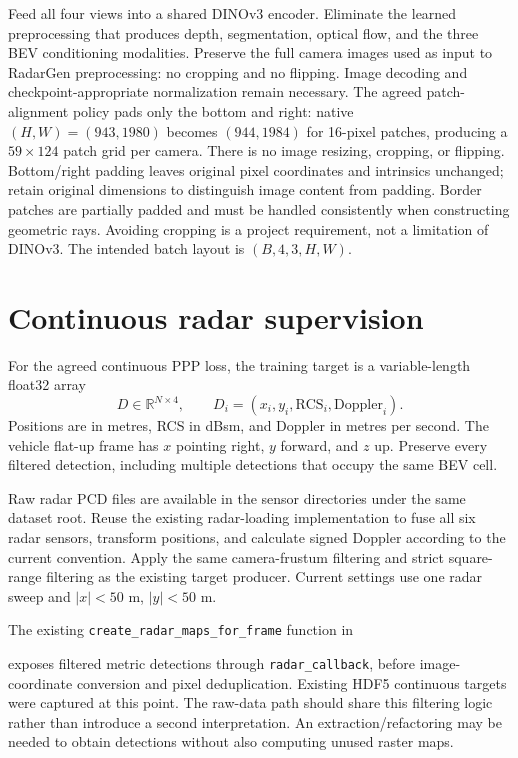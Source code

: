 \documentclass[11pt,a4paper]{article}
\begin{document}
Feed all four views into a shared DINOv3 encoder. Eliminate the learned preprocessing that produces depth, segmentation, optical flow, and the three BEV conditioning modalities. Preserve the full camera images used as input to RadarGen preprocessing: no cropping and no flipping. Image decoding and checkpoint-appropriate normalization remain necessary. The agreed patch-alignment policy pads only the bottom and right: native $(H,W)=(943,1980)$ becomes $(944,1984)$ for 16-pixel patches, producing a $59\times124$ patch grid per camera. There is no image resizing, cropping, or flipping. Bottom/right padding leaves original pixel coordinates and intrinsics unchanged; retain original dimensions to distinguish image content from padding. Border patches are partially padded and must be handled consistently when constructing geometric rays. Avoiding cropping is a project requirement, not a limitation of DINOv3. The intended batch layout is $(B,4,3,H,W)$.

\section{Continuous radar supervision}
For the agreed continuous PPP loss, the training target is a variable-length float32 array
\[
 D\in\mathbb{R}^{N\times4},\qquad D_i=(x_i,y_i,\mathrm{RCS}_i,\mathrm{Doppler}_i).
\]
Positions are in metres, RCS in dBsm, and Doppler in metres per second. The vehicle flat-up frame has $x$ pointing right, $y$ forward, and $z$ up. Preserve every filtered detection, including multiple detections that occupy the same BEV cell.

Raw radar PCD files are available in the sensor directories under the same dataset root. Reuse the existing radar-loading implementation to fuse all six radar sensors, transform positions, and calculate signed Doppler according to the current convention. Apply the same camera-frustum filtering and strict square-range filtering as the existing target producer. Current settings use one radar sweep and $|x|<50$ m, $|y|<50$ m.

The existing \texttt{create\_radar\_maps\_for\_frame} function in
\begin{quote}\small{}\end{quote}
exposes filtered metric detections through \texttt{radar\_callback}, before image-coordinate conversion and pixel deduplication. Existing HDF5 continuous targets were captured at this point. The raw-data path should share this filtering logic rather than introduce a second interpretation. An extraction/refactoring may be needed to obtain detections without also computing unused raster maps.
\end{document}
